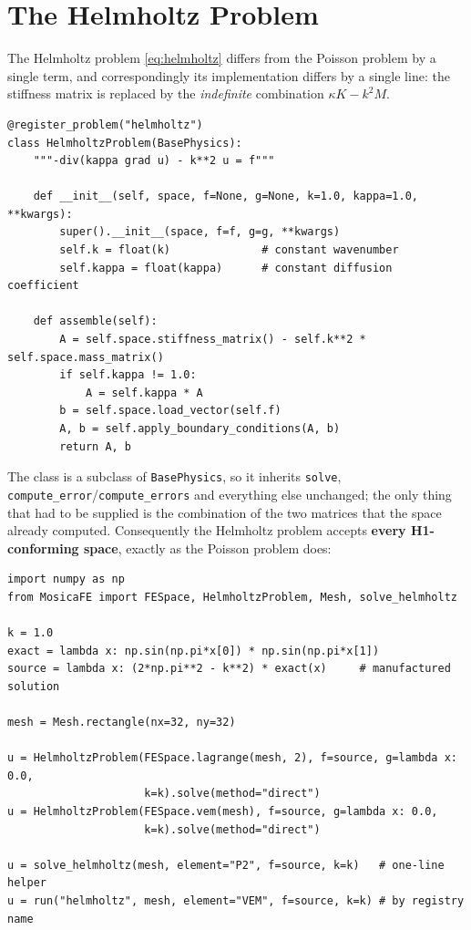 \documentclass[11pt,oneside]{book}
\theoremstyle{definition}
\theoremstyle{plain}
\newcommand{\code}[1]{\texttt{#1}}
\begin{document}
\section{The Helmholtz Problem}
\label{sec:helmholtz}

The Helmholtz problem \eqref{eq:helmholtz} differs from the Poisson problem by a
single term, and correspondingly its implementation differs by a single line: the
stiffness matrix is replaced by the \emph{indefinite} combination
$\kappa K-k^2M$.

\begin{lstlisting}[language=MosicaFE,caption={Assembly of the Helmholtz problem (complete implementation)},label={lst:helmholtz}]
@register_problem("helmholtz")
class HelmholtzProblem(BasePhysics):
    """-div(kappa grad u) - k**2 u = f"""

    def __init__(self, space, f=None, g=None, k=1.0, kappa=1.0, **kwargs):
        super().__init__(space, f=f, g=g, **kwargs)
        self.k = float(k)              # constant wavenumber
        self.kappa = float(kappa)      # constant diffusion coefficient

    def assemble(self):
        A = self.space.stiffness_matrix() - self.k**2 * self.space.mass_matrix()
        if self.kappa != 1.0:
            A = self.kappa * A
        b = self.space.load_vector(self.f)
        A, b = self.apply_boundary_conditions(A, b)
        return A, b
\end{lstlisting}

The class is a subclass of \code{BasePhysics}, so it inherits \code{solve},
\code{compute\_\allowbreak error}/\allowbreak\code{compute\_\allowbreak errors} and everything else unchanged; the
only thing that had to be supplied is the combination of the two matrices that the
space already computed. Consequently the Helmholtz problem accepts \textbf{every
H1-conforming space}, exactly as the Poisson problem does:

\begin{lstlisting}[language=MosicaFE,caption={The same equation on any element family}]
import numpy as np
from MosicaFE import FESpace, HelmholtzProblem, Mesh, solve_helmholtz

k = 1.0
exact = lambda x: np.sin(np.pi*x[0]) * np.sin(np.pi*x[1])
source = lambda x: (2*np.pi**2 - k**2) * exact(x)     # manufactured solution

mesh = Mesh.rectangle(nx=32, ny=32)

u = HelmholtzProblem(FESpace.lagrange(mesh, 2), f=source, g=lambda x: 0.0,
                     k=k).solve(method="direct")
u = HelmholtzProblem(FESpace.vem(mesh), f=source, g=lambda x: 0.0,
                     k=k).solve(method="direct")

u = solve_helmholtz(mesh, element="P2", f=source, k=k)   # one-line helper
u = run("helmholtz", mesh, element="VEM", f=source, k=k) # by registry name
\end{lstlisting}
\end{document}

